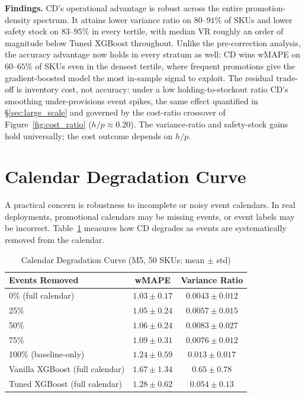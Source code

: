 \documentclass[10pt]{article} %
\theoremstyle{plain}
\theoremstyle{definition}
\begin{document}
\textbf{Findings.} CD's operational advantage is robust across the entire promotion-density spectrum. It attains lower variance ratio on $80$--$91\%$ of SKUs and lower safety stock on $83$--$95\%$ in every tertile, with median VR roughly an order of magnitude below Tuned XGBoost throughout. Unlike the pre-correction analysis, the accuracy advantage now holds in every stratum as well: CD wins wMAPE on $60$--$65\%$ of SKUs even in the densest tertile, where frequent promotions give the gradient-boosted model the most in-sample signal to exploit. The residual trade-off is inventory cost, not accuracy: under a low holding-to-stockout ratio CD's smoothing under-provisions event spikes, the same effect quantified in \S\ref{sec:large_scale} and governed by the cost-ratio crossover of Figure~\ref{fig:cost_ratio} ($h/p \approx 0.20$). The variance-ratio and safety-stock gains hold universally; the cost outcome depends on $h/p$.

\section{Calendar Degradation Curve}
\label{app:degradation}

A practical concern is robustness to incomplete or noisy event calendars. In real deployments, promotional calendars may be missing events, or event labels may be incorrect. Table~\ref{tab:calendar_noise} measures how CD degrades as events are systematically removed from the calendar.

\begin{table}[ht]
\centering
\small
\caption{Calendar Degradation Curve (M5, 50 SKUs; mean $\pm$ std)}
\label{tab:calendar_noise}
\begin{tabular}{@{}lcc@{}}
\toprule
Events Removed & wMAPE & Variance Ratio \\
\midrule
0\% (full calendar) & $1.03 \pm 0.17$ & $0.0043 \pm 0.012$ \\
25\% & $1.05 \pm 0.24$ & $0.0057 \pm 0.015$ \\
50\% & $1.06 \pm 0.24$ & $0.0083 \pm 0.027$ \\
75\% & $1.09 \pm 0.31$ & $0.0076 \pm 0.012$ \\
100\% (baseline-only) & $1.24 \pm 0.59$ & $0.013 \pm 0.017$ \\
\midrule
Vanilla XGBoost (full calendar) & $1.67 \pm 1.34$ & $0.65 \pm 0.78$ \\
Tuned XGBoost (full calendar) & $1.28 \pm 0.62$ & $0.054 \pm 0.13$ \\
\bottomrule
\end{tabular}
\end{table}
\end{document}
